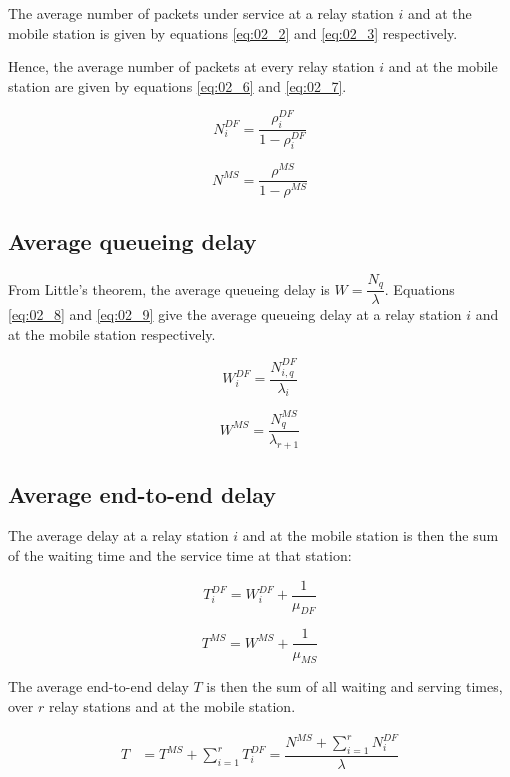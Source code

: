 The average number of packets under service at a relay station $i$ and at the
mobile station is given by equations \ref{eq:02_2} and \ref{eq:02_3} respectively.

Hence, the average number of packets at every relay station $i$ and at the
mobile station are given by equations \ref{eq:02_6} and \ref{eq:02_7}.

\begin{equation}
  N_i^{DF} = \dfrac{\rho_i^{DF}}{1 - \rho_i^{DF}}
  \label{eq:02_6}
\end{equation}

\begin{equation}
  N^{MS} =  \dfrac{\rho^{MS}}{1 - \rho^{MS}}
  \label{eq:02_7}
\end{equation}


\subsection{Average queueing delay}

From Little's theorem, the average queueing delay is $W = \dfrac{N_q}{\lambda}$.
Equations \ref{eq:02_8} and \ref{eq:02_9} give the average queueing delay at a
relay station $i$ and at the mobile station respectively.

\begin{equation}
  W_i^{DF} = \dfrac{N_{i,q}^{DF}}{\lambda_i}
  \label{eq:02_8}
\end{equation}

\begin{equation}
  W^{MS} = \dfrac{N_q^{MS}}{\lambda_{r+1}}
  \label{eq:02_9}
\end{equation}


\subsection{Average end-to-end delay}

The average delay at a relay station $i$ and at the mobile station is then the
sum of the waiting time and the service time at that station:

\begin{equation}
  T_i^{DF} = W_i^{DF} + \dfrac{1}{\mu_{DF}}
  \label{eq:02_10}
\end{equation}

\begin{equation}
  T^{MS} = W^{MS} + \dfrac{1}{\mu_{MS}}
  \label{eq:02_11}
\end{equation}


The average end-to-end delay $T$ is then the sum of all waiting and serving times,
over $r$ relay stations and at the mobile station.

\begin{align*}
  T &= T^{MS} + \sum\limits_{i=1}^r T_i^{DF}= \dfrac{N^{MS} + \sum\limits_{i=1}^r N_i^{DF}}{\lambda}
\end{align*}
